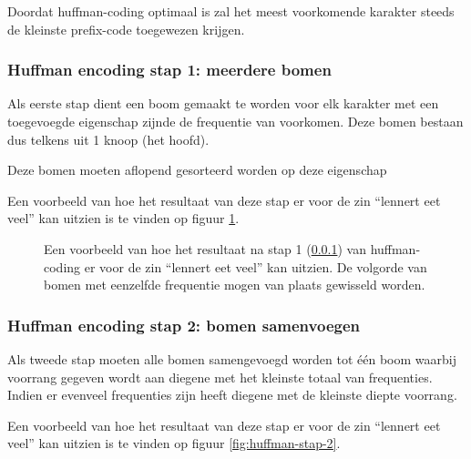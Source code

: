Doordat \gls{huffman-coding} optimaal is zal het meest voorkomende karakter steeds de kleinste \gls{prefix-code} toegewezen krijgen.

\subsubsection{Huffman encoding stap 1: meerdere bomen}
\label{sec:primitieve-technieken-voorbeeld-huffman-encoding-1}
Als eerste stap dient een boom gemaakt te worden voor elk karakter met een toegevoegde eigenschap zijnde de frequentie van voorkomen. Deze bomen bestaan dus telkens uit 1 knoop (het hoofd).

Deze bomen moeten aflopend gesorteerd worden op deze eigenschap 

Een voorbeeld van hoe het resultaat van deze stap er voor de zin “lennert eet veel” kan uitzien is te vinden op figuur \ref{fig:huffman-stap-1}.

\FloatBarrier
\begin{figure}[h!]
	\caption{Een voorbeeld van hoe het resultaat na stap 1 (\ref{sec:primitieve-technieken-voorbeeld-huffman-encoding-1}) van \gls{huffman-coding} er voor de zin “lennert eet veel” kan uitzien. De volgorde van bomen met eenzelfde frequentie mogen van plaats gewisseld worden.}
	\label{fig:huffman-stap-1}
\end{figure}
\FloatBarrier

\subsubsection{Huffman encoding stap 2: bomen samenvoegen}
\label{sec:primitieve-technieken-voorbeeld-huffman-encoding-2}
Als tweede stap moeten alle bomen samengevoegd worden tot één boom waarbij voorrang gegeven wordt aan diegene met het kleinste totaal van frequenties. Indien er evenveel frequenties zijn heeft diegene met de kleinste diepte voorrang.

Een voorbeeld van hoe het resultaat van deze stap er voor de zin “lennert eet veel” kan uitzien is te vinden op figuur \ref{fig:huffman-stap-2}.

